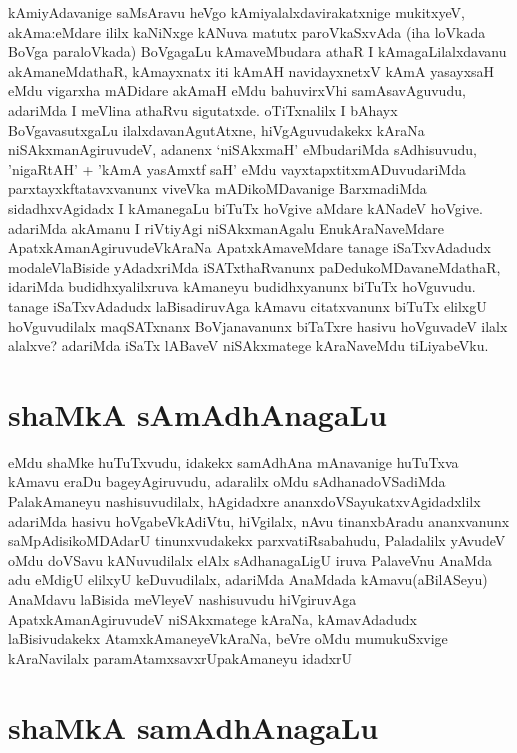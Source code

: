 \begin{artha}
kAmiyAdavanige saMsAravu heVgo kAmiyalalxdavirakatxnige mukitxyeV, akAma:eMdare ililx kaNiNxge kANuva matutx paroVkaSxvAda (iha loVkada BoVga paraloVkada) BoVgagaLu kAmaveMbudara athaR I kAmagaLilalxdavanu akAmaneMdathaR, kAmayxnatx iti kAmAH navidayxnetxV kAmA yasayxsaH eMdu vigarxha mADidare akAmaH eMdu bahuvirxVhi samAsavAguvudu, adariMda I meVlina athaRvu sigutatxde. oTiTxnalilx I bAhayx BoVgavasutxgaLu ilalxdavanAgutAtxne, hiVgAguvudakekx kAraNa niSAkxmanAgiruvudeV, adanenx `niSAkxmaH' eMbudariMda sAdhisuvudu, 'nigaRtAH' + 'kAmA yasAmxtf saH' eMdu vayxtapxtitxmADuvudariMda parxtayxkftatavxvanunx viveVka mADikoMDavanige BarxmadiMda sidadhxvAgidadx I kAmanegaLu biTuTx hoVgive aMdare kANadeV hoVgive. adariMda akAmanu I riVtiyAgi niSAkxmanAgalu EnukAraNaveMdare ApatxkAmanAgiruvudeVkAraNa ApatxkAmaveMdare tanage iSaTxvAdadudx modaleVlaBiside yAdadxriMda iSATxthaRvanunx paDedukoMDavaneMdathaR, idariMda budidhxyalilxruva kAmaneyu budidhxyanunx biTuTx hoVguvudu. tanage iSaTxvAdadudx laBisadiruvAga kAmavu citatxvanunx biTuTx elilxgU hoVguvudilalx maqSATxnanx BoVjanavanunx biTaTxre hasivu hoVguvadeV ilalx alalxve? adariMda iSaTx lABaveV niSAkxmatege kAraNaveMdu tiLiyabeVku.
\end{artha}
\newpage

\section*{shaMkA sAmAdhAnagaLu}
\begin{artha}
eMdu shaMke huTuTxvudu, idakekx samAdhAna mAnavanige huTuTxva kAmavu eraDu bageyAgiruvudu, adaralilx oMdu sAdhanadoVSadiMda PalakAmaneyu nashisuvudilalx, hAgidadxre ananxdoVSayukatxvAgidadxlilx adariMda hasivu hoVgabeVkAdiVtu, hiVgilalx, nAvu tinanxbAradu ananxvanunx saMpAdisikoMDAdarU tinunxvudakekx parxvatiRsabahudu, Paladalilx yAvudeV oMdu doVSavu kANuvudilalx elAlx sAdhanagaLigU iruva PalaveVnu AnaMda adu eMdigU elilxyU keDuvudilalx, adariMda AnaMdada kAmavu(aBilASeyu) AnaMdavu laBisida meVleyeV nashisuvudu hiVgiruvAga ApatxkAmanAgiruvudeV niSAkxmatege kAraNa, kAmavAdadudx laBisivudakekx AtamxkAmaneyeVkAraNa, beVre oMdu mumukuSxvige kAraNavilalx paramAtamxsavxrUpakAmaneyu idadxrU  
\end{artha}

\section*{shaMkA samAdhAnagaLu} 

